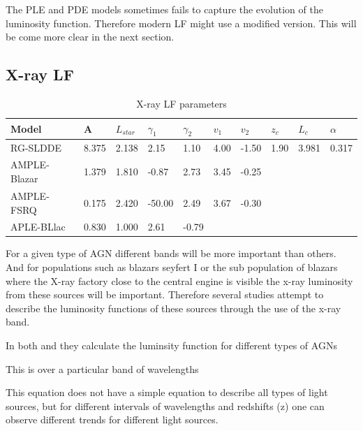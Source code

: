 \documentclass{article}
\begin{document}
The PLE and PDE models sometimes fails to capture the evolution of the luminosity function. Therefore modern 
LF might use a modified version. This will be come more clear in the next section.

\subsection{X-ray LF}

\begin{table}
\centering
\begin{tabularx}{\textwidth}{|l|X|X|X|X|X|X|X|X|X|}
\hline
Model & A & $L_{star}$ & $\gamma _1$ &  $\gamma _2$  & $v_1$ & $v_2$ & $z_c$ & $L_c$ & $ \alpha$\\
\hline
RG-SLDDE & 8.375 & 2.138 & 2.15 & 1.10 & 4.00 & -1.50 & 1.90 & 3.981 & 0.317  \\
\hline
AMPLE-Blazar & 1.379 & 1.810 & -0.87 & 2.73 & 3.45 & -0.25 & & &  \\
\hline
AMPLE-FSRQ & 0.175 & 2.420& -50.00 & 2.49 & 3.67 & -0.30 & & &  \\
\hline
APLE-BLlac & 0.830& 1.000 & 2.61 & -0.79 & & & & &  \\
\hline
\end{tabularx}
\caption{X-ray LF parameters}
\end{table}



For a given type of AGN different bands will be more important than others. And for populations such as blazars seyfert I or the sub population of blazars where the 
X-ray factory close to the central engine is visible the x-ray luminosity from these sources will be important. 
Therefore several studies attempt to describe the luminosity functions of these sources through the use of the x-ray band. 


In both \cite{Ajello_2009} and \cite{Ueda_2003} they calculate the luminsity function for different types of AGNs



This is over a particular band of wavelengths


This equation does not have a simple equation to describe all types of light sources, but for different intervals of wavelengths and redshifts (z) one can observe different trends for different light sources. 
\end{document}
